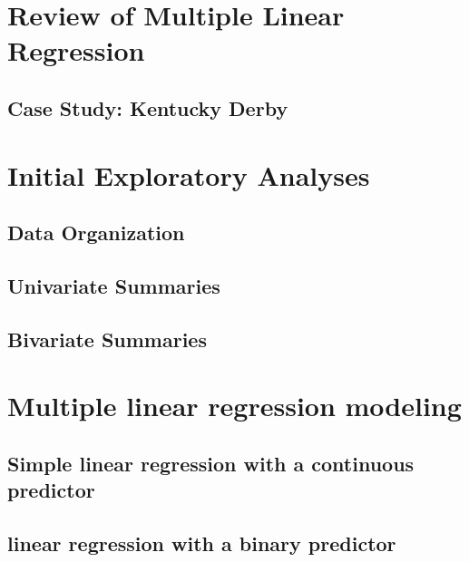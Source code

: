 \documentclass[
]{krantz}
\begin{document}
\hypertarget{review-of-multiple-linear-regression}{%
\section{Review of Multiple Linear Regression}\label{review-of-multiple-linear-regression}}

\hypertarget{cs:derby}{%
\subsection{Case Study: Kentucky Derby}\label{cs:derby}}

\hypertarget{explore}{%
\section{Initial Exploratory Analyses}\label{explore}}

\hypertarget{data-organization}{%
\subsection{Data Organization}\label{data-organization}}

\hypertarget{univariate-summaries}{%
\subsection{Univariate Summaries}\label{univariate-summaries}}

\hypertarget{bivariate-summaries}{%
\subsection{Bivariate Summaries}\label{bivariate-summaries}}

\hypertarget{multreg}{%
\section{Multiple linear regression modeling}\label{multreg}}

\hypertarget{SLRcontinuous}{%
\subsection{Simple linear regression with a continuous predictor}\label{SLRcontinuous}}

\hypertarget{linear-regression-with-a-binary-predictor}{%
\subsection{linear regression with a binary predictor}\label{linear-regression-with-a-binary-predictor}}
\end{document}
